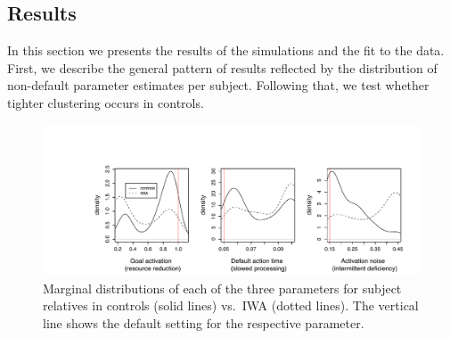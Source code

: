 \documentclass[10pt,letterpaper]{article}
\begin{document}
\subsection{Results}

In this section we presents the results of the simulations and the fit to the data. First, we describe the general pattern of results reflected by the distribution of non-default parameter estimates per subject. Following that, we test whether tighter clustering occurs in controls.

%
%
%


\begin{figure}[!htbp]
  \centering
  \includegraphics[width=\textwidth]{./figures/margSR.pdf}
  \caption{Marginal distributions of each of the three parameters for subject relatives in controls (solid lines) vs.\ IWA (dotted lines). The vertical line shows the default setting for the respective parameter.}
  \label{fig:margSR}
\end{figure}
\end{document}
